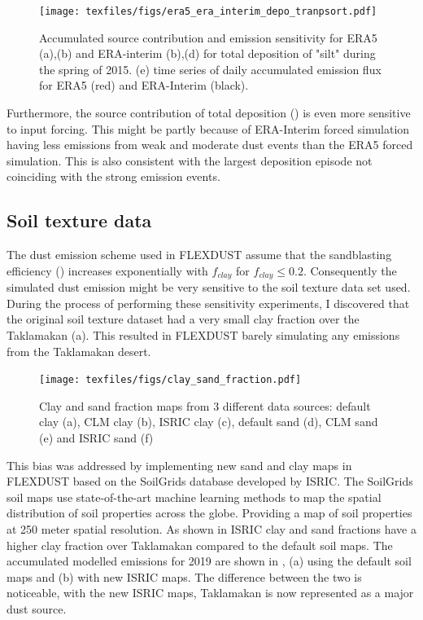 \begin{figure}[htbp]
    \centering
    \texttt{[image: texfiles/figs/era5\_era\_interim\_depo\_tranpsort.pdf]}
    \caption{Accumulated source contribution and emission sensitivity for ERA5 (a),(b) and ERA-interim (b),(d) for total deposition of "silt" during the spring of 2015. (e) time series of daily accumulated emission flux for ERA5 (red) and ERA-Interim (black).}
    \label{fig:era5_era_interim_source}
\end{figure}

Furthermore, the source contribution of total deposition () is even more sensitive to input forcing. 
This might be partly because of ERA-Interim forced simulation having less emissions from weak and moderate dust events than the ERA5 forced simulation. 
This is also consistent with the largest deposition episode not coinciding with the strong emission events.
\subsection{Soil texture data}\label{sec:sens_soil}
The dust emission scheme used in FLEXDUST assume that the sandblasting efficiency () increases exponentially with $f_{clay}$ for $f_{clay} \leq 0.2$. Consequently the simulated dust emission might be very sensitive to the soil texture data set used.
During the process of performing these sensitivity experiments, I discovered that the original soil texture dataset had a very small clay fraction over the Taklamakan (a). This resulted in FLEXDUST barely simulating any emissions from the Taklamakan desert.

\begin{figure}[hptb]
    \centering
    \texttt{[image: texfiles/figs/clay\_sand\_fraction.pdf]}
    \caption{Clay and sand fraction maps from 3 different data sources: default clay (a), CLM clay (b), ISRIC clay (c), default sand (d), CLM sand (e) and ISRIC sand (f)}
    \label{fig:clay_sand_fraction_comparison}
\end{figure}

This bias was addressed by implementing new sand and clay maps in FLEXDUST based on the SoilGrids database developed by ISRIC.  The SoilGrids soil maps use state-of-the-art machine learning methods to map the spatial distribution of soil properties across the globe.
Providing a map of soil properties at 250 meter spatial resolution. 
As shown in  ISRIC clay and sand fractions have a higher clay fraction over Taklamakan compared to the default soil maps. 
The accumulated modelled emissions for 2019 are shown in , (a) using the default soil maps and (b) with new ISRIC maps. 
The difference between the two is noticeable, with the new ISRIC maps, Taklamakan is now represented as a major dust source.

